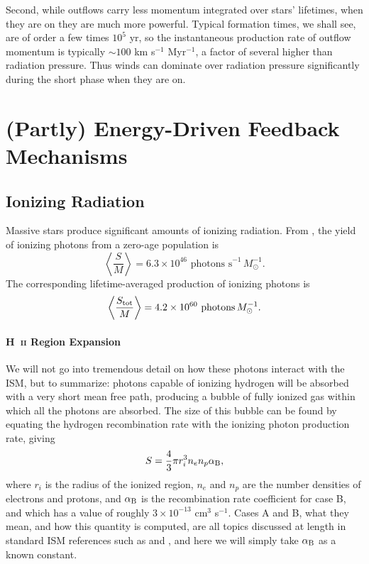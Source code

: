 Second, while outflows carry less momentum integrated over stars' lifetimes, when they are on they are much more powerful. Typical formation times, we shall see, are of order a few times $10^5$ yr, so the instantaneous production rate of outflow momentum is typically $\sim 100$ km s$^{-1}$ Myr$^{-1}$, a factor of several higher than radiation pressure. Thus winds can dominate over radiation pressure significantly during the short phase when they are on.

\section{(Partly) Energy-Driven Feedback Mechanisms}

\subsection{Ionizing Radiation}

Massive stars produce significant amounts of ionizing radiation. From \citet{murray10b}, the yield of ionizing photons from a zero-age population is
\begin{equation}
\left\langle\frac{S}{M}\right\rangle = 6.3\times 10^{46}\mbox{ photons s}^{-1}\,M_\odot^{-1}.
\end{equation}
The corresponding lifetime-averaged production of ionizing photons is
\begin{equation}
\left\langle \frac{S_{\rm tot}}{M}\right\rangle = 4.2\times 10^{60}\mbox{ photons}\,M_{\odot}^{-1}.
\end{equation}

\paragraph{H~\textsc{ii} Region Expansion}

We will not go into tremendous detail on how these photons interact with the ISM, but to summarize: photons capable of ionizing hydrogen will be absorbed with a very short mean free path, producing a bubble of fully ionized gas within which all the photons are absorbed. The size of this bubble can be found by equating the hydrogen recombination rate with the ionizing photon production rate, giving
\begin{equation}
S = \frac{4}{3} \pi r_i^3 n_e n_p \alpha_{\mathrm{B}},
\end{equation}
where $r_i$ is the radius of the ionized region, $n_e$ and $n_p$ are the number densities of electrons and protons, and $\alpha_{\mathrm{B}}$ is the recombination rate coefficient for case B, and which has a value of roughly $3\times 10^{-13}$ cm$^3$ s$^{-1}$. Cases A and B, what they mean, and how this quantity is computed, are all topics discussed at length in standard ISM references such as \citet{osterbrock06a} and \citet{draine11a}, and here we will simply take $\alpha_{\mathrm{B}}$ as a known constant.

